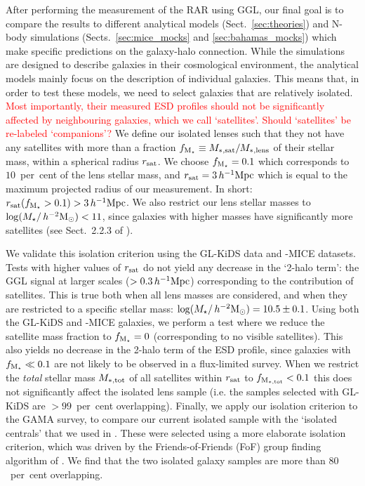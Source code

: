 \documentclass[usenatbib]{mnras}
\newcommand{\hmsun}{\,h^{-2} {\rm M_\odot}}
\newcommand{\hMpc}{\, h^{-1}{\rm{Mpc}} }
\newcommand{\un}[1]{_{\rm #1}}
\begin{document}
After performing the measurement of the RAR using GGL, our final goal is to compare the results to different analytical models (Sect.~\ref{sec:theories}) and N-body simulations (Sects.~\ref{sec:mice_mocks} and \ref{sec:bahamas_mocks}) which make specific predictions on the galaxy-halo connection. While the simulations are designed to describe galaxies in their cosmological environment, the analytical models mainly focus on the description of individual galaxies. This means that, in order to test these models, we need to select galaxies that are relatively isolated. \textcolor{red}{Most importantly, their measured ESD profiles should not be significantly affected by neighbouring galaxies, which we call `satellites'. Should `satellites' be re-labeled `companions'?} We define our isolated lenses such that they not have any satellites with more than a fraction $f\un{M_\star} \equiv M\un{*,sat}/M\un{*,lens}$ of their stellar mass, within a spherical radius $r\un{sat}$. We choose $f\un{M_\star}=0.1$ which corresponds to $10$~per~cent of the lens stellar mass, and $r\un{sat}=3\hMpc$ which is equal to the maximum projected radius of our measurement. In short: $r\un{sat}(f\un{M_\star}>0.1)>3\hMpc$. We also restrict our lens stellar masses to $\log(M_\star/\hmsun)<11$, since galaxies with higher masses have significantly more satellites (see Sect.~2.2.3 of \citealp{brouwer2017}).

We validate this isolation criterion using the GL-KiDS data and -MICE datasets. Tests with higher values of $r\un{sat}$ do not yield any decrease in the `2-halo term': the GGL signal at larger scales ($>0.3\hMpc$) corresponding to the contribution of satellites. This is true both when all lens masses are considered, and when they are restricted to a specific stellar mass: $\log(M_\star/\hmsun)=10.5\pm0.1$. Using both the GL-KiDS and -MICE galaxies, we perform a test where we reduce the satellite mass fraction to $f\un{M_\star}=0$ (corresponding to no visible satellites). This also yields no decrease in the 2-halo term of the ESD profile, since galaxies with $f\un{M_\star}\ll0.1$ are not likely to be observed in a flux-limited survey. When we restrict the \emph{total} stellar mass $M\un{*,tot}$ of all satellites within $r\un{sat}$ to $f\un{M\un{*,tot}}<0.1$ this does not significantly affect the isolated lens sample (i.e. the samples selected with GL-KiDS are $>99$~per~cent overlapping). Finally, we apply our isolation criterion to the GAMA survey, to compare our current isolated sample with the `isolated centrals' that we used in \cite{brouwer2017}. These were selected using a more elaborate isolation criterion, which was driven by the Friends-of-Friends (FoF) group finding algorithm of \cite{robotham2011}. We find that the two isolated galaxy samples are more than $80$~per~cent overlapping.
\end{document}
